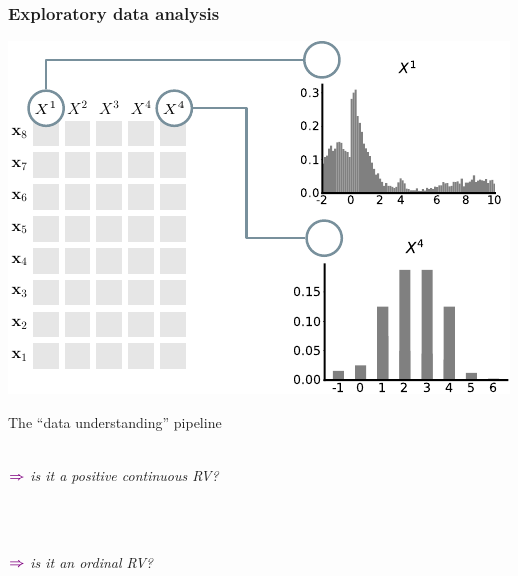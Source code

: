 \documentclass[xcolor={usenames,dvipsnames,svgnames}, compress, aspectratio=169, 11pt]{beamer}
\newcommand{\comment}[3][\small]{\begin{minipage}{1\linewidth}
          \raggedleft
          {
            $\color{violet}\boldsymbol\Rightarrow$
            #1
            {\emph{#2}}
          }
      \end{minipage}#3\\
}
\begin{document}
\begin{frame}[t, htt=bgrey2]
  \frametitle{Exploratory data analysis}

  \large
  \begin{minipage}[t]{0.6\linewidth}
    \includegraphics[width=.99\linewidth]{figures/abda-hist-type}
  \end{minipage}\hfill\begin{minipage}[t]{0.4\linewidth}
    \vspace{-150pt}
    {The ``data understanding'' pipeline}\\[5pt]
    \\
    \comment[\normalsize]{is it a positive continuous RV?}{}\\
    \comment[\normalsize]{is it an ordinal RV?}{}\\
  \end{minipage}  
\end{frame}
\end{document}
